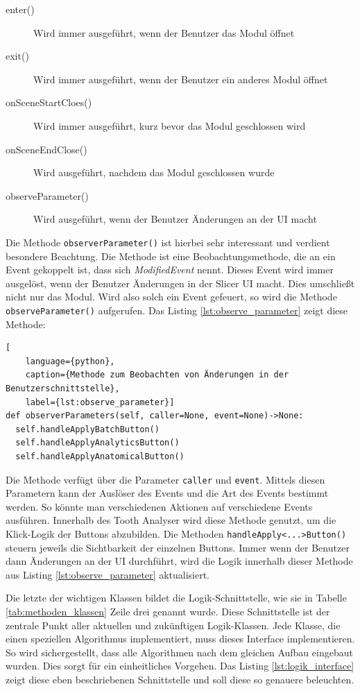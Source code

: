 \begin{description}
	\item[enter()] Wird immer ausgeführt, wenn der Benutzer das Modul öffnet

	\item[exit()] Wird immer ausgeführt, wenn der Benutzer ein anderes Modul
		öffnet

	\item[onSceneStartCloes()] Wird immer ausgeführt, kurz bevor das Modul
		geschlossen wird

	\item[onSceneEndClose()] Wird ausgeführt, nachdem das Modul geschlossen wurde

	\item[observeParameter()] Wird ausgeführt, wenn der Benutzer Änderungen an der
		\ac{UI} macht
\end{description}

Die Methode \texttt{observerParameter()} ist hierbei sehr interessant und
verdient besondere Beachtung. Die Methode ist eine Beobachtungsmethode, die an
ein Event gekoppelt ist, dass sich \textit{ModifiedEvent} nennt. Dieses Event wird
immer ausgelöst, wenn der Benutzer Änderungen in der Slicer \ac{UI} macht. Dies
umschließt nicht nur das Modul. Wird also solch ein Event gefeuert, so wird die
Methode \texttt{observeParameter()} aufgerufen. Das Listing
\ref{lst:observe_parameter} zeigt diese Methode:

\begin{lstlisting}[
    language={python},
    caption={Methode zum Beobachten von Änderungen in der Benutzerschnittstelle},
    label={lst:observe_parameter}]
def observerParameters(self, caller=None, event=None)->None:
  self.handleApplyBatchButton()
  self.handleApplyAnalyticsButton()
  self.handleApplyAnatomicalButton()
\end{lstlisting}

Die Methode verfügt über die Parameter \texttt{caller} und \texttt{event}.
Mittels diesen Parametern kann der Auslöser des Events und die Art des Events
bestimmt werden. So könnte man verschiedenen Aktionen auf verschiedene Events ausführen.
Innerhalb des Tooth Analyser wird diese Methode genutzt, um die Klick-Logik der Buttons
abzubilden. Die Methoden \texttt{handleApply<...>Button()} steuern jeweils die Sichtbarkeit
der einzelnen Buttons. Immer wenn der Benutzer dann Änderungen an der UI
durchführt, wird die Logik innerhalb dieser Methode aus Listing \ref{lst:observe_parameter}
aktualisiert.

Die letzte der wichtigen Klassen bildet die Logik-Schnittstelle, wie sie in
Tabelle \ref{tab:methoden_klassen} Zeile drei genannt wurde. Diese Schnittstelle
ist der zentrale Punkt aller aktuellen und zukünftigen Logik-Klassen. Jede
Klasse, die einen speziellen Algorithmus implementiert, muss dieses Interface
implementieren. So wird sichergestellt, dass alle Algorithmen nach dem gleichen
Aufbau eingebaut wurden. Dies sorgt für ein einheitliches Vorgehen. Das Listing
\ref{lst:logik_interface} zeigt diese eben beschriebenen Schnittstelle und soll
diese so genauere beleuchten.


